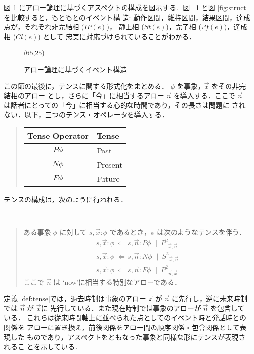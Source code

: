 図 \ref{fig:new} にアロー論理に基づくアスペクトの構成を図示する．図~
 \ref{fig:new} と図 \ref{fig:struct} を比較すると，もともとのイベント構
造: 動作区間，維持区間，結果区間，達成点が，それぞれ非完結相 ($IP(e)$)，
静止相 ($St(e)$)，完了相 ($P\!f(e)$)，達成相 ($Cl(e)$) として
忠実に対応づけられていることがわかる．
\begin{figure}[htbp]
\atari(65,25)
\caption{アロー論理に基づくイベント構造}\label{fig:new}
\end{figure}

この節の最後に，テンスに関する形式化をまとめる．
$\phi$ を事象，$\vec x$ をその非完結相のアロー 
とし，さらに「今」に相当するアロー $\vec n$ を導入する．ここで $\vec 
n$ は話者にとっての「今」に相当する心的な時間であり，その長さは問題に
されない．以下，三つのテンス・オペレータを導入する．
\begin{quote}
\begin{tabular}[b]{cl}
Tense Operator&Tense\\ \hline
$P\phi$&Past\\
$N\phi$&Present\\
$F\phi$&Future\\
\end{tabular}
\end{quote}
テンスの構成は，次のように行われる．
\begin{my-def}[テンス]\label{def:tense}~
\begin{quote}
ある事象 $\phi$ に対して
$s,{\vec x} \colon \phi$ であるとき，$\phi$ は次のようなテンスを伴う．
\[\begin{array}{l}
s,{\vec x}\colon\phi ~\Leftarrow ~s,{\vec n}\colon P\phi ~\|~{P^{2}}_{{\vec
x},{\vec n}}\\
s,{\vec x}\colon\phi ~\Leftarrow ~s,{\vec n}\colon N\phi ~\|~{S^{2}}_{{\vec
x},{\vec n}}\\ 
s,{\vec x}\colon\phi ~\Leftarrow ~s,{\vec n}\colon F\phi ~\|~{P^{2}}_{{\vec
n},{\vec x}} 
\end{array}\]
ここで $\vec n$ は `now'に相当する特別なアローである．
\end{quote}
\end{my-def}
定義 \ref{def:tense}では，過去時制は事象のアロー
$\vec x$ が $\vec n$ に先行し，逆に未来時制では $\vec n$ が $\vec x$に
先行している．また現在時制では事象のアローが $\vec n$ を包含している．
これらは従来時間軸上に並べられた点としてのイベント時と発話時との関係を
アローに置き換え，前後関係をアロー間の順序関係・包含関係として表現した
ものであり，アスペクトをともなった事象と同様な形にテンスが表現されるこ
とを示している．

